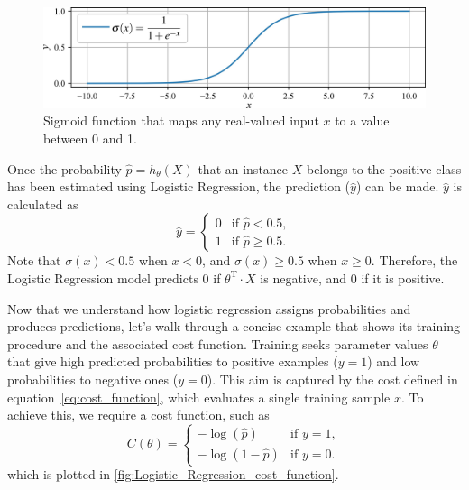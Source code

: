\documentclass[12pt,letter]{article}
\begin{document}
		\begin{figure}[H]
			\centering
			\includegraphics[width=6.1in]{../figures/sigmoid_function}
			\caption{Sigmoid function that maps any real-valued input $x$ to a value between 0 and 1. }
			\label{fig:sigmoid_function}
		\end{figure}

Once the probability $\hat{p} = h_\theta(X)$ that an instance $X$ belongs to the positive class has been estimated using Logistic Regression, the prediction ($\hat{y}$) can be made. $\hat{y}$ is calculated as
\begin{equation}
  \hat{y} = 
  \begin{cases}
  0 & \text{if } \hat{p} < 0.5, \\
  1 & \text{if } \hat{p} \ge 0.5.
  \end{cases}
\label{eq:model_prediction}
\end{equation}
Note that $\sigma(x) < 0.5$ when $x < 0$, and $\sigma(x) \ge 0.5$ when $x \ge 0$. Therefore, the Logistic Regression model predicts 0 if $\theta^\text{T} \cdot X$ is negative, and 0 if it is positive.

Now that we understand how logistic regression assigns probabilities and produces predictions, let's walk through a concise example that shows its training procedure and the associated cost function.
Training seeks parameter values $\theta$ that give high predicted probabilities to positive examples ($y = 1$) and low probabilities to negative ones ($y = 0$). This aim is captured by the cost defined in equation~\ref{eq:cost_function}, which evaluates a single training sample $x$. To achieve this, we require a cost function, such as 
\begin{equation}
  C(\theta) = 
  \begin{cases}
  - \log (\hat{p}) & \text{if } y=1, \\
  - \log (1-\hat{p}) & \text{if } y=0.
  \end{cases}
\label{eq:cost_function}
\end{equation}
which is plotted in \ref{fig:Logistic_Regression_cost_function}.
\end{document}
